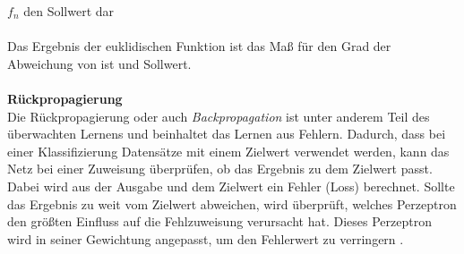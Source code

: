 	$f_{n}$ den Sollwert dar\\\\
Das Ergebnis der euklidischen Funktion ist das Maß für den Grad der Abweichung von ist und Sollwert.\\\\
\textbf{Rückpropagierung}\\
Die Rückpropagierung oder auch \textit{Backpropagation} \cite{ertel2013grundkurs} ist unter anderem Teil des überwachten Lernens und beinhaltet das Lernen aus Fehlern. Dadurch, dass bei einer Klassifizierung Datensätze mit einem Zielwert verwendet werden, kann das Netz bei einer Zuweisung überprüfen, ob das Ergebnis zu dem Zielwert passt. Dabei wird aus der Ausgabe und dem Zielwert ein Fehler (Loss) berechnet. Sollte das Ergebnis zu weit vom Zielwert abweichen, wird überprüft, welches Perzeptron den größten Einfluss auf die Fehlzuweisung verursacht hat. Dieses Perzeptron wird in seiner Gewichtung angepasst, um den Fehlerwert zu verringern \cite{goodfellow2016deep}.  
